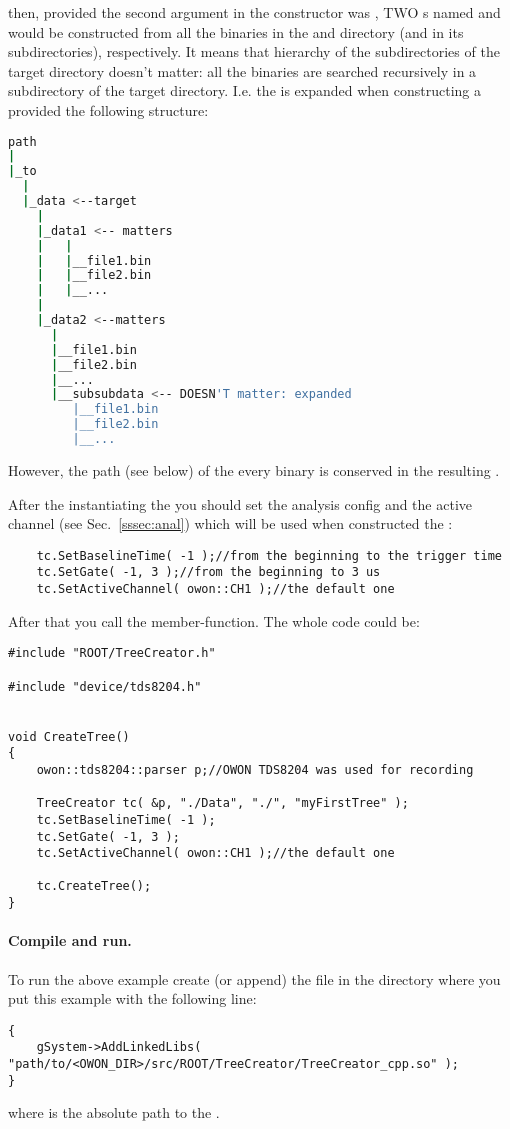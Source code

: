 then, provided the second argument in the  constructor
was , TWO s named  and
 would be constructed from all the binaries in the  and
 directory (and in its subdirectories), respectively.
It means that hierarchy of the subdirectories of the target directory doesn't matter:
all the binaries are searched recursively in a subdirectory of the target directory. I.e.
the  is expanded when constructing a  provided the following
structure:
\begin{lstlisting}[language=bash]
path
|
|_to
  |
  |_data <--target
    |
    |_data1 <-- matters
    |   | 
    |   |__file1.bin
    |   |__file2.bin
    |   |__...
    |
    |_data2 <--matters
      |
      |__file1.bin
      |__file2.bin
      |__...
      |__subsubdata <-- DOESN'T matter: expanded
         |__file1.bin
         |__file2.bin
         |__...
\end{lstlisting}
However, the path (see below) of the every binary is conserved in the resulting
.

After the instantiating the  you should set the analysis config and
the active channel
(see Sec.~\ref{sssec:anal}) which will be used when constructed the :
\begin{lstlisting}
    tc.SetBaselineTime( -1 );//from the beginning to the trigger time
    tc.SetGate( -1, 3 );//from the beginning to 3 us
    tc.SetActiveChannel( owon::CH1 );//the default one
\end{lstlisting}

After that you call the  member-function. The whole code could be:

\begin{lstlisting}
#include "ROOT/TreeCreator.h"

#include "device/tds8204.h"


void CreateTree()
{
    owon::tds8204::parser p;//OWON TDS8204 was used for recording

    TreeCreator tc( &p, "./Data", "./", "myFirstTree" );
    tc.SetBaselineTime( -1 );
    tc.SetGate( -1, 3 );
    tc.SetActiveChannel( owon::CH1 );//the default one

    tc.CreateTree();
}
\end{lstlisting}

\paragraph*{Compile and run.} To run the above example create (or append) the  file in the directory
where you put this example with the following line:
\begin{lstlisting}
{
    gSystem->AddLinkedLibs( "path/to/<OWON_DIR>/src/ROOT/TreeCreator/TreeCreator_cpp.so" );
}
\end{lstlisting}
where  is the absolute path to the .

